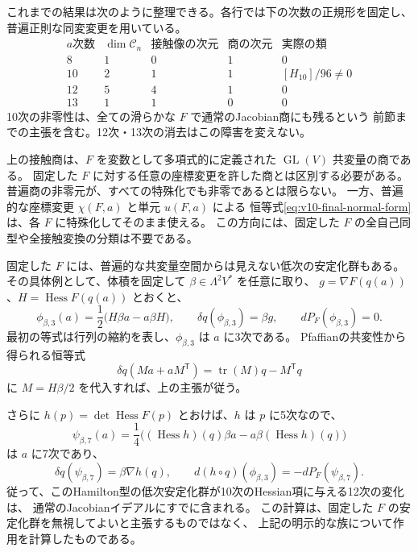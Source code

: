 これまでの結果は次のように整理できる。各行では下の次数の正規形を固定し、
普遍正則な同変変更を用いている。
\[
\begin{array}{c|c|c|c|c}
 a\text{次数}&\dim\mathcal C_n&\text{接触像の次元}&\text{商の次元}
                                      &\text{実際の類}\\\hline
 8&1&0&1&0\\
 10&2&1&1&[H_{10}]/96\ne0\\
 12&5&4&1&0\\
 13&1&1&0&0
\end{array}
\]
10次の非零性は、全ての滑らかな $F$ で通常のJacobian商にも残るという
前節までの主張を含む。12次・13次の消去はこの障害を変えない。


\begin{remark}[普遍的消去と固定した三次式での消去]
\label{rem:v10-universal-fixed-scope}
上の接触商は、$F$ を変数として多項式的に定義された
$\operatorname{GL}(V)$ 共変量の商である。
固定した $F$ に対する任意の座標変更を許した商とは区別する必要がある。
普遍商の非零元が、すべての特殊化でも非零であるとは限らない。
一方、普遍的な座標変更 $\chi(F,a)$ と単元 $u(F,a)$ による
恒等式\eqref{eq:v10-final-normal-form}は、各 $F$ に特殊化してそのまま使える。
この方向には、固定した $F$ の全自己同型や全接触変換の分類は不要である。

固定した $F$ には、普遍的な共変量空間からは見えない低次の安定化群もある。
その具体例として、体積を固定して $\beta\in\Lambda^2V^*$ を任意に取り、
$g=\nabla F(q(a))$、$H=\operatorname{Hess}F(q(a))$ とおくと、
\[
 \phi_{\beta,3}(a)=\frac12\bigl(H\beta a-a\beta H\bigr),
 \qquad \delta q(\phi_{\beta,3})=\beta g,
 \qquad dP_F(\phi_{\beta,3})=0.
\]
最初の等式は行列の縮約を表し、$\phi_{\beta,3}$ は $a$ に3次である。
Pfaffianの共変性から得られる恒等式
\[
 \delta q(Ma+aM^{\mathsf T})
    =\operatorname{tr}(M)q-M^{\mathsf T}q
\]
に $M=H\beta/2$ を代入すれば、上の主張が従う。

さらに $h(p)=\det\operatorname{Hess}F(p)$ とおけば、$h$ は $p$ に5次なので、
\[
 \psi_{\beta,7}(a)
   =\frac14\bigl((\operatorname{Hess}h)(q)\beta a
                       -a\beta(\operatorname{Hess}h)(q)\bigr)
\]
は $a$ に7次であり、
\[
 \delta q(\psi_{\beta,7})=\beta\nabla h(q),\qquad
 d(h\circ q)(\phi_{\beta,3})=-dP_F(\psi_{\beta,7}).
\]
従って、このHamilton型の低次安定化群が10次のHessian項に与える12次の変化は、
通常のJacobianイデアルにすでに含まれる。
この計算は、固定した $F$ の安定化群を無視してよいと主張するものではなく、
上記の明示的な族について作用を計算したものである。
\end{remark}



